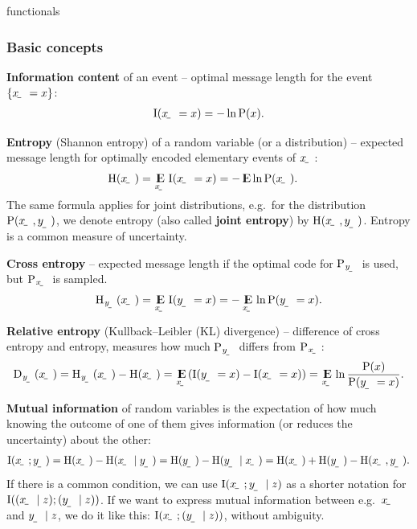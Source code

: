 \documentclass[twocolumn]{article}
\begin{document}
functionals

\subsubsection{Basic concepts}

\textbf{Information content} of an event -- optimal message length for the event $\event{\rvar x=x}$:
\begin{align}
\I(\rvar x=x) = -\ln\P(x) \text.
\end{align}

\textbf{Entropy} (Shannon entropy) of a random variable (or a distribution) -- expected message length for optimally encoded elementary events of $\rvar x$:
\begin{align}
    \H(\rvar x) &= \E_{\rvar x}\I(\rvar x=x) = -\E\ln\P(\rvar x) \text.
\end{align}
The same formula applies for joint distributions, e.g.\ for the distribution $\P(\rvar x,\rvar y)$, we denote entropy (also called \textbf{joint entropy}) by $\H(\rvar x,\rvar y)$. Entropy is a common measure of uncertainty.

\textbf{Cross entropy} -- expected message length if the optimal code for $\P_\rvar{y}$ is used, but $\P_\rvar{x}$ is sampled.
\begin{align}
    \H_\rvar{y}(\rvar x) = \E_{\rvar x}\I(\rvar y=x) = -\E_{\rvar x}\ln\P(\rvar y=x) \text.
\end{align}

\textbf{Relative entropy} (Kullback–Leibler (KL) divergence) -- difference of cross entropy and entropy, measures how much $\P_\rvar{y}$ differs from $\P_\rvar{x}$:
\begin{align}
    \Dist_\rvar{y}(\rvar x) = \H_\rvar{y}(\rvar x) - \H(\rvar x) = \E_\rvar{x}\del{\I(\rvar y=x)-\I(\rvar x=x)} = \E_\rvar{x}\ln\frac{\P(x)}{\P(\rvar y=x)} \text.
\end{align}

\textbf{Mutual information} of random variables is the expectation of how much knowing the outcome of one of them gives information (or reduces the uncertainty) about the other:
\begin{align}
    \I(\rvar x; \rvar y) = \H(\rvar x) - \H(\rvar x\mid\rvar y) = \H(\rvar y) - \H(\rvar y\mid\rvar x) = \H(\rvar x) +\H(\rvar y) - \H(\rvar x, \rvar y) \text.
\end{align}
If there is a common condition, we can use $\I\del{\rvar x; \rvar y\mid z}$ as a shorter notation for $\I\del{(\rvar x\mid z); (\rvar y\mid z)}$. If we want to express mutual information between e.g.\ $\rvar x$ and $\rvar y\mid z$, we do it like this: $\I(\rvar x;(\rvar y\mid z))$, without ambiguity.
\end{document}
